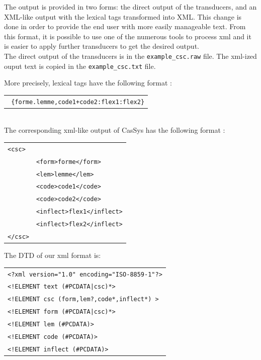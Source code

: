 The output is provided in two forms: the direct output of the transducers, and an XML-like output with the lexical tags transformed into XML. This change is done in order to provide the end user with more easily manageable text. 
From this format, it is possible to use one of the numerous tools to process xml and it is easier to apply further transducers to get the desired output.\\
The direct output of the transducers is in the \texttt{example\_csc.raw} file. The xml-ized ouput text is copied in the \texttt{example\_csc.txt} file.

More precisely, lexical tags have the following format :\\
\begin{tabular}{c}
\texttt{
\{forme.lemme,code1+code2:flex1:flex2\}}
\end{tabular}\\
The corresponding xml-like output of CasSys has the following format :\\
\begin{tabular}{ll}
\texttt{<csc>}&\\
	&\texttt{<form>forme</form>}\\
	&\texttt{<lem>lemme</lem>}\\
	&\texttt{<code>code1</code>}\\
	&\texttt{<code>code2</code>}\\
	&\texttt{<inflect>flex1</inflect>}\\
	&\texttt{<inflect>flex2</inflect>}\\
\texttt{</csc>}&\\
\end{tabular}

The DTD of our xml format is:

\begin{tabular}{l}
\texttt{<?xml version="1.0" encoding="ISO-8859-1"?>}\\
\texttt{<!ELEMENT text (\#PCDATA|csc)*>}\\
\texttt{<!ELEMENT csc (form,lem?,code*,inflect*) >}\\
\texttt{<!ELEMENT form (\#PCDATA|csc)*>}\\
\texttt{<!ELEMENT lem (\#PCDATA)>}\\
\texttt{<!ELEMENT code (\#PCDATA)>}\\
\texttt{<!ELEMENT inflect (\#PCDATA)>}\\
\end{tabular}


